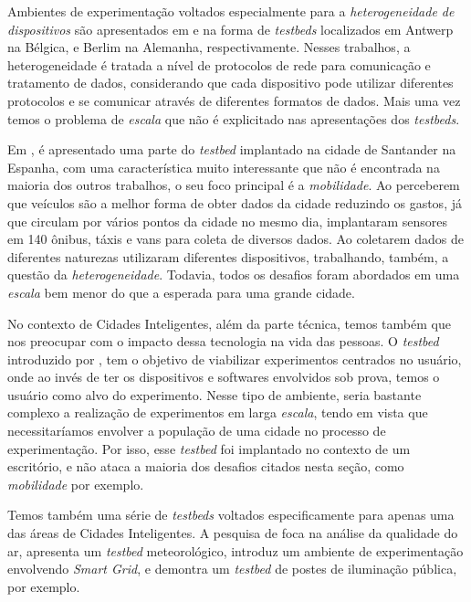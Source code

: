 Ambientes de experimentação voltados especialmente para a \textit{heterogeneidade de dispositivos} são apresentados em \cite{latre_2016} e \cite{juraschek_2012} na forma de \textit{testbeds} localizados
em Antwerp na Bélgica, e Berlim na Alemanha, respectivamente.
Nesses trabalhos, a heterogeneidade é tratada a nível de protocolos de rede para comunicação e tratamento de dados, considerando que cada dispositivo pode utilizar diferentes protocolos e se comunicar
através de diferentes formatos de dados.
Mais uma vez temos o problema de \textit{escala} que não é explicitado nas apresentações dos \textit{testbeds}.

Em \cite{lanza_2015}, é apresentado uma parte do \textit{testbed} implantado na cidade de Santander na Espanha, com uma característica muito interessante que não é encontrada na maioria dos outros
trabalhos, o seu foco principal é a \textit{mobilidade}.
Ao perceberem que veículos são a melhor forma de obter dados da cidade reduzindo os gastos, já que circulam por vários pontos da cidade no mesmo dia, implantaram sensores em 140 ônibus, táxis e vans
para coleta de diversos dados.
Ao coletarem dados de diferentes naturezas utilizaram diferentes dispositivos, trabalhando, também, a questão da \textit{heterogeneidade}.
Todavia, todos os desafios foram abordados em uma \textit{escala} bem menor do que a esperada para uma grande cidade.

No contexto de Cidades Inteligentes, além da parte técnica, temos também que nos preocupar com o impacto dessa tecnologia na vida das pessoas.
O \textit{testbed} introduzido por \cite{nati_2013}, tem o objetivo de viabilizar experimentos centrados no usuário, onde ao invés de ter os dispositivos e softwares envolvidos sob prova, temos
o usuário como alvo do experimento.
Nesse tipo de ambiente, seria bastante complexo a realização de experimentos em larga \textit{escala}, tendo em vista que necessitaríamos envolver a população de uma cidade no processo de
experimentação.
Por isso, esse \textit{testbed} foi implantado no contexto de um escritório, e não ataca a maioria dos desafios citados nesta seção, como \textit{mobilidade} por exemplo.

Temos também uma série de \textit{testbeds} voltados especificamente para apenas uma das áreas de Cidades Inteligentes.
A pesquisa de \cite{braem_2016} foca na análise da qualidade do ar, \cite{lee_2015} apresenta um \textit{testbed} meteorológico, \cite{lu_2010} introduz um ambiente de experimentação envolvendo
\textit{Smart Grid}, e \cite{amrutur_2017} demontra um \textit{testbed} de postes de iluminação pública, por exemplo.

